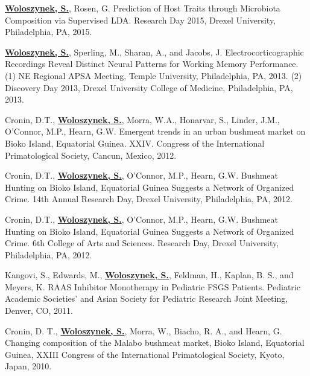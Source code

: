 \begin{cventries}
{\begin{cvitems}
{        \item{\textbf{\underline{Woloszynek, S.}}, Rosen, G. Prediction of Host Traits through Microbiota Composition via Supervised LDA. Research Day 2015, Drexel University, Philadelphia, PA, 2015.}
        \item{\textbf{\underline{Woloszynek, S.}}, Sperling, M., Sharan, A., and Jacobs, J. Electrocorticographic Recordings Reveal Distinct Neural Patterns for Working Memory Performance. (1) NE Regional APSA Meeting, Temple University, Philadelphia, PA, 2013. (2) Discovery Day 2013, Drexel University College of Medicine, Philadelphia, PA, 2013.}
        \item{Cronin, D.T., \textbf{\underline{Woloszynek, S.}}, Morra, W.A., Honarvar, S., Linder, J.M., O’Connor, M.P., Hearn, G.W. Emergent trends in an urban bushmeat market on Bioko Island, Equatorial Guinea. XXIV. Congress of the International Primatological Society, Cancun, Mexico, 2012.}
        \item{Cronin, D.T., \textbf{\underline{Woloszynek, S.}}, O’Connor, M.P., Hearn, G.W. Bushmeat Hunting on Bioko Island, Equatorial Guinea Suggests a Network of Organized Crime. 14th Annual Research Day, Drexel University, Philadelphia, PA, 2012.}
        \item{Cronin, D.T., \textbf{\underline{Woloszynek, S.}}, O’Connor, M.P., Hearn, G.W. Bushmeat Hunting on Bioko Island, Equatorial Guinea Suggests a Network of Organized Crime. 6th College of Arts and Sciences. Research Day, Drexel University, Philadelphia, PA, 2012.}
        \item{Kangovi, S., Edwards, M., \textbf{\underline{Woloszynek, S.}}, Feldman, H., Kaplan, B. S., and Meyers, K. RAAS Inhibitor Monotherapy in Pediatric FSGS Patients. Pediatric Academic Societies' and Asian Society for Pediatric Research Joint Meeting, Denver, CO, 2011.}
        \item{Cronin, D. T., \textbf{\underline{Woloszynek, S.}}, Morra, W., Biacho, R. A., and Hearn, G. Changing composition of the Malabo bushmeat market, Bioko Island, Equatorial Guinea, XXIII Congress of the International Primatological Society, Kyoto, Japan, 2010.}
        }
      \end{cvitems}
    }
    

\end{cventries}
